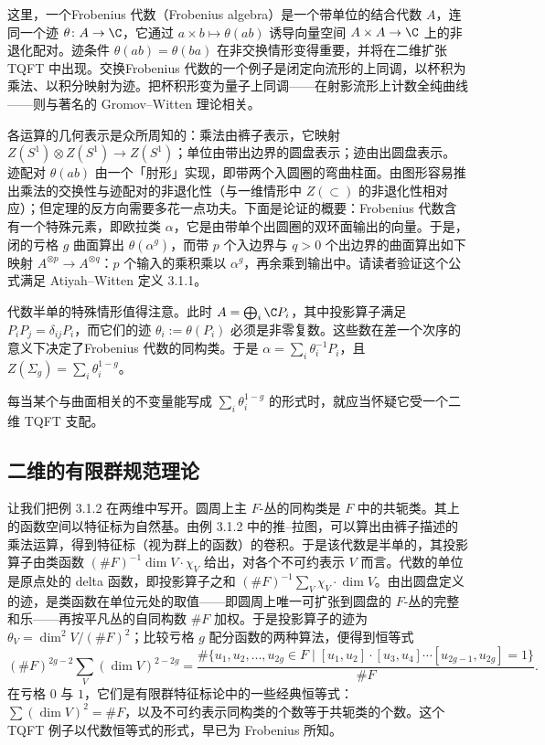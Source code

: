 这里，一个Frobenius 代数（Frobenius algebra）是一个带单位的结合代数 $A$，连同一个迹 $\theta\colon A\to\C$，它通过 $a\times b\mapsto\theta(ab)$ 诱导向量空间 $A\times A\to\C$ 上的非退化配对。迹条件 $\theta(ab)=\theta(ba)$ 在非交换情形变得重要，并将在二维扩张 TQFT 中出现。交换Frobenius 代数的一个例子是闭定向流形的上同调，以杯积为乘法、以积分映射为迹。把杯积形变为量子上同调——在射影流形上计数全纯曲线——则与著名的 Gromov--Witten 理论相关。

各运算的几何表示是众所周知的：乘法由裤子表示，它映射 $Z(S^1)\otimes Z(S^1)\to Z(S^1)$；单位由带出边界的圆盘表示；迹由出圆盘表示。迹配对 $\theta(ab)$ 由一个「肘形」实现，即带两个入圆圈的弯曲柱面。由图形容易推出乘法的交换性与迹配对的非退化性（与一维情形中 $Z(\subset)$ 的非退化性相对应）；但定理的反方向需要多花一点功夫。下面是论证的概要：Frobenius 代数含有一个特殊元素，即欧拉类 $\alpha$，它是由带单个出圆圈的双环面输出的向量。于是，闭的亏格 $g$ 曲面算出 $\theta(\alpha^g)$，而带 $p$ 个入边界与 $q>0$ 个出边界的曲面算出如下映射 $A^{\otimes p}\to A^{\otimes q}$：$p$ 个输入的乘积乘以 $\alpha^g$，再余乘到输出中。请读者验证这个公式满足 Atiyah--Witten 定义 3.1.1。

代数半单的特殊情形值得注意。此时 $A=\bigoplus_i\C P_i$，其中投影算子满足 $P_iP_j=\delta_{ij}P_i$，而它们的迹 $\theta_i:=\theta(P_i)$ 必须是非零复数。这些数在差一个次序的意义下决定了Frobenius 代数的同构类。于是 $\alpha=\sum_i\theta_i^{-1}P_i$，且 $Z(\Sigma_g)=\sum_i\theta_i^{1-g}$。

每当某个与曲面相关的不变量能写成 $\sum_i\theta_i^{1-g}$ 的形式时，就应当怀疑它受一个二维 TQFT 支配。

\subsection{二维的有限群规范理论}

让我们把例 3.1.2 在两维中写开。圆周上主 $F$-丛的同构类是 $F$ 中的共轭类。其上的函数空间以特征标为自然基。由例 3.1.2 中的推–拉图，可以算出由裤子描述的乘法运算，得到特征标（视为群上的函数）的卷积。于是该代数是半单的，其投影算子由类函数 $(\#F)^{-1}\dim V\cdot\chi_V$ 给出，对各个不可约表示 $V$ 而言。代数的单位是原点处的 delta 函数，即投影算子之和 $(\#F)^{-1}\sum_V\chi_V\cdot\dim V$。由出圆盘定义的迹，是类函数在单位元处的取值——即圆周上唯一可扩张到圆盘的 $F$-丛的完整和乐——再按平凡丛的自同构数 $\#F$ 加权。于是投影算子的迹为 $\theta_V=\dim^2V/(\#F)^2$；比较亏格 $g$ 配分函数的两种算法，便得到恒等式
\[
(\#F)^{2g-2}\sum_V(\dim V)^{2-2g}
=\frac{\#\{u_1,u_2,\dots,u_{2g}\in F\mid [u_1,u_2]\cdot[u_3,u_4]\cdots[u_{2g-1},u_{2g}]=1\}}{\#F}.
\]
在亏格 $0$ 与 $1$，它们是有限群特征标论中的一些经典恒等式：$\sum(\dim V)^2=\#F$，以及不可约表示同构类的个数等于共轭类的个数。这个 TQFT 例子以代数恒等式的形式，早已为 Frobenius 所知。

